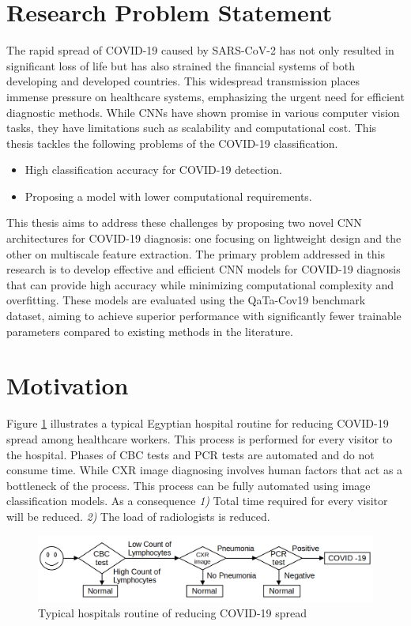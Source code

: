 \section{Research Problem Statement} 
The rapid spread of COVID-19 caused by SARS-CoV-2 has not only resulted in significant loss of life but has also strained the financial systems of both developing and developed countries. This widespread transmission places immense pressure on healthcare systems, emphasizing the urgent need for efficient diagnostic methods. While CNNs have shown promise in various computer vision tasks, they have limitations such as scalability and computational cost.
This thesis tackles the following problems of the COVID-19 classification.
\begin{itemize}
    \item High classification accuracy for COVID-19 detection.
    \item Proposing a model with lower computational requirements.
\end{itemize} 
 This thesis aims to address these challenges by proposing two novel CNN architectures for COVID-19 diagnosis: one focusing on lightweight design and the other on multiscale feature extraction. The primary problem addressed in this research is to develop effective and efficient CNN models for COVID-19 diagnosis that can provide high accuracy while minimizing computational complexity and overfitting. These models are evaluated using the QaTa-Cov19 benchmark dataset, aiming to achieve superior performance with significantly fewer trainable parameters compared to existing methods in the literature.

\section{Motivation}
Figure \ref{hospitalRoutine} illustrates a typical Egyptian hospital routine for reducing COVID-19 spread among healthcare workers. This process is performed for every visitor to the hospital. Phases of CBC tests and PCR tests are automated and do not consume time. While CXR image diagnosing involves human factors that act as a bottleneck of the process. This process can be fully automated using image classification models. As a consequence \textit{1)} Total time required for every visitor will be reduced. \textit{2)} The load of radiologists is reduced. 

\begin{figure}%
    \centering
        \includegraphics[width=\textwidth]{Figures/HosPitalCovidRoutine.png}
        \caption{Typical hospitals routine of reducing COVID-19 spread}
        \label{hospitalRoutine}
\end{figure}

